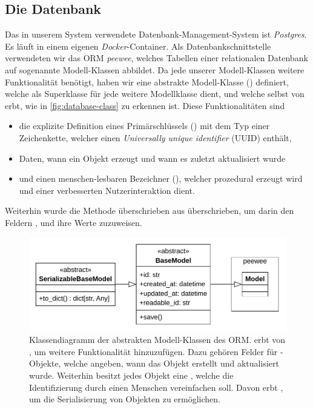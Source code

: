 \subsection{Die Datenbank}

Das in unserem System verwendete Datenbank-Management-System ist \emph{Postgres}. Es läuft in einem eigenen \emph{Docker}-Container. Als Datenbankschnittstelle verwendeten wir das ORM \emph{peewee}, welches Tabellen einer relationalen Datenbank auf sogenannte Modell-Klassen abbildet. Da jede unserer Modell-Klassen weitere Funktionalität benötigt, haben wir eine abstrakte Modell-Klasse () definiert, welche als Superklasse für jede weitere Modellklasse dient, und welche selbst von  erbt, wie in \autoref{fig:database-class} zu erkennen ist. Diese Funktionalitäten sind
\begin{itemize}
	\item die explizite Definition eines Primärschlüssels () mit dem Typ einer Zeichenkette, welcher einen \emph{Universally unique identifier} (UUID) enthält,
	\item Daten, wann ein Objekt erzeugt und wann es zuletzt aktualisiert wurde
	\item und einen menschen-lesbaren Bezeichner (), welcher prozedural erzeugt wird und einer verbesserten Nutzerinteraktion dient.
\end{itemize}
Weiterhin wurde die Methode  überschrieben aus  überschrieben, um darin den Feldern ,  und  ihre Werte zuzuweisen.

\begin{figure}[!ht]
	\centering
	\includegraphics[width=0.75\linewidth]{images/diagrams/database-class.pdf}
	\caption{Klassendiagramm der abstrakten Modell-Klassen des ORM.  erbt von , um weitere Funktionalität hinzuzufügen. Dazu gehören Felder für -Objekte, welche angeben, wann das Objekt erstellt und aktualisiert wurde. Weiterhin besitzt jedes Objekt eine , welche die Identifizierung durch einen Menschen vereinfachen soll. Davon erbt , um die Serialisierung von Objekten zu ermöglichen.}
	\label{fig:database-class}
\end{figure}

